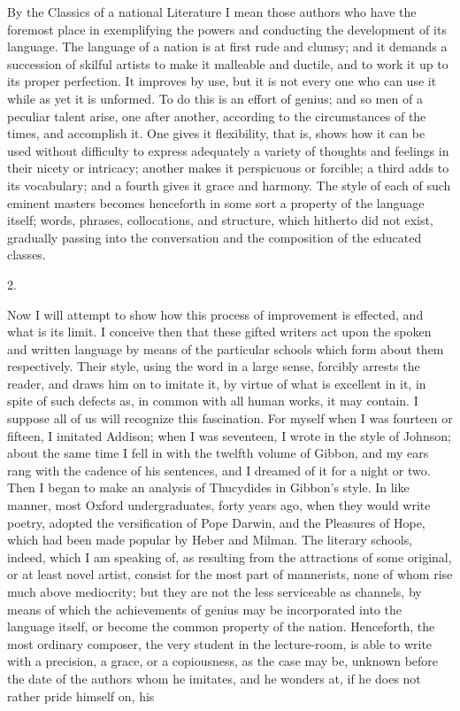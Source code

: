By the Classics of a national Literature I mean those authors who
have the foremost place in exemplifying the powers and conducting the
development of its language. The language of a nation is at first rude
and clumsy; and it demands a succession of skilful artists to make it
malleable and ductile, and to work it up to its proper perfection. It
improves by use, but it is not every one who can use it while as yet
it is unformed. To do this is an effort of genius; and so men of a
peculiar talent arise, one after another, according to the
circumstances of the times, and accomplish it. One gives it
flexibility, that is, shows how it can be used without difficulty to
express adequately a variety of thoughts and feelings in their nicety
or intricacy; another makes it perspicuous or forcible; a third adds
to its vocabulary; and a fourth gives it grace and harmony. The style
of each of such eminent masters becomes henceforth in some sort a
property of the language itself; words, phrases, collocations, and
structure, which hitherto did not exist, gradually passing into
the conversation and the composition of the educated classes.

2.

Now I will attempt to show how this process of improvement is
effected, and what is its limit. I conceive then that these gifted
writers act upon the spoken and written language by means of the
particular schools which form about them respectively. Their style,
using the word in a large sense, forcibly arrests the reader, and
draws him on to imitate it, by virtue of what is excellent in it, in
spite of such defects as, in common with all human works, it may
contain. I suppose all of us will recognize this fascination. For
myself when I was fourteen or fifteen, I imitated Addison; when I was
seventeen, I wrote in the style of Johnson; about the same time I fell
in with the twelfth volume of Gibbon, and my ears rang with the
cadence of his sentences, and I dreamed of it for a night or two. Then
I began to make an analysis of Thucydides in Gibbon's style. In like
manner, most Oxford undergraduates, forty years ago, when they would
write poetry, adopted the versification of Pope Darwin, and the
Pleasures of Hope, which had been made popular by Heber and Milman.
The literary schools, indeed, which I am speaking of, as resulting
from the attractions of some original, or at least novel artist,
consist for the most part of mannerists, none of whom rise much above
mediocrity; but they are not the less serviceable as channels, by
means of which the achievements of genius may be incorporated into the
language itself, or become the common property of the nation.
Henceforth, the most ordinary composer, the very student in the
lecture-room, is able to write with a precision, a grace, or a
copiousness, as the case may be, unknown before the date of the
authors whom he imitates, and he wonders at, if he does not rather
pride himself on, his

